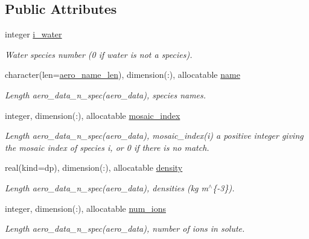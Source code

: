 \subsection*{Public Attributes}
\begin{DoxyCompactItemize}
\item 
integer \mbox{\hyperlink{structpmc__aero__data_1_1aero__data__t_a9a0224c67a8eda60c33da1c389b47069}{i\+\_\+water}}
\begin{DoxyCompactList}\small\item\em Water species number (0 if water is not a species). \end{DoxyCompactList}\item 
character(len=\mbox{\hyperlink{namespacepmc__aero__data_a05ba86cdbb1bbbacbbc41cce6eba6474}{aero\+\_\+name\+\_\+len}}), dimension(\+:), allocatable \mbox{\hyperlink{structpmc__aero__data_1_1aero__data__t_afb8febbf8e8e40a57e0be7a992282dd8}{name}}
\begin{DoxyCompactList}\small\item\em Length {\ttfamily aero\+\_\+data\+\_\+n\+\_\+spec(aero\+\_\+data)}, species names. \end{DoxyCompactList}\item 
integer, dimension(\+:), allocatable \mbox{\hyperlink{structpmc__aero__data_1_1aero__data__t_a200054b5f1899b689afdc41530ae6079}{mosaic\+\_\+index}}
\begin{DoxyCompactList}\small\item\em Length {\ttfamily aero\+\_\+data\+\_\+n\+\_\+spec(aero\+\_\+data)}, mosaic\+\_\+index(i) a positive integer giving the mosaic index of species i, or 0 if there is no match. \end{DoxyCompactList}\item 
real(kind=dp), dimension(\+:), allocatable \mbox{\hyperlink{structpmc__aero__data_1_1aero__data__t_a727518f99245c84dd49d6ea8debe16d1}{density}}
\begin{DoxyCompactList}\small\item\em Length {\ttfamily aero\+\_\+data\+\_\+n\+\_\+spec(aero\+\_\+data)}, densities (kg m$^\wedge$\{-\/3\}). \end{DoxyCompactList}\item 
integer, dimension(\+:), allocatable \mbox{\hyperlink{structpmc__aero__data_1_1aero__data__t_aed40573e7ffe47eb946d7ce3d7d82a4b}{num\+\_\+ions}}
\begin{DoxyCompactList}\small\item\em Length {\ttfamily aero\+\_\+data\+\_\+n\+\_\+spec(aero\+\_\+data)}, number of ions in solute. \end{DoxyCompactList}\item 

\end{DoxyCompactItemize}
